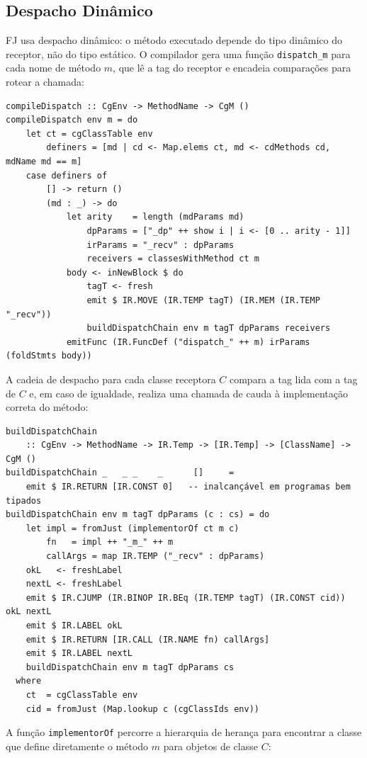 \subsection{Despacho Dinâmico}

FJ usa despacho dinâmico: o método executado depende do tipo dinâmico
do receptor, não do tipo estático. O compilador gera uma função
\texttt{dispatch\_m} para cada nome de método \(m\), que lê a tag do
receptor e encadeia comparações para rotear a chamada:

\begin{verbatim}
compileDispatch :: CgEnv -> MethodName -> CgM ()
compileDispatch env m = do
    let ct = cgClassTable env
        definers = [md | cd <- Map.elems ct, md <- cdMethods cd, mdName md == m]
    case definers of
        [] -> return ()
        (md : _) -> do
            let arity    = length (mdParams md)
                dpParams = ["_dp" ++ show i | i <- [0 .. arity - 1]]
                irParams = "_recv" : dpParams
                receivers = classesWithMethod ct m
            body <- inNewBlock $ do
                tagT <- fresh
                emit $ IR.MOVE (IR.TEMP tagT) (IR.MEM (IR.TEMP "_recv"))
                buildDispatchChain env m tagT dpParams receivers
            emitFunc (IR.FuncDef ("dispatch_" ++ m) irParams (foldStmts body))
\end{verbatim}

A cadeia de despacho para cada classe receptora \(C\) compara a tag lida
com a tag de \(C\) e, em caso de igualdade, realiza uma chamada de cauda
à implementação correta do método:

\begin{verbatim}
buildDispatchChain
    :: CgEnv -> MethodName -> IR.Temp -> [IR.Temp] -> [ClassName] -> CgM ()
buildDispatchChain _   _ _    _      []     =
    emit $ IR.RETURN [IR.CONST 0]   -- inalcançável em programas bem tipados
buildDispatchChain env m tagT dpParams (c : cs) = do
    let impl = fromJust (implementorOf ct m c)
        fn   = impl ++ "_m_" ++ m
        callArgs = map IR.TEMP ("_recv" : dpParams)
    okL   <- freshLabel
    nextL <- freshLabel
    emit $ IR.CJUMP (IR.BINOP IR.BEq (IR.TEMP tagT) (IR.CONST cid)) okL nextL
    emit $ IR.LABEL okL
    emit $ IR.RETURN [IR.CALL (IR.NAME fn) callArgs]
    emit $ IR.LABEL nextL
    buildDispatchChain env m tagT dpParams cs
  where
    ct  = cgClassTable env
    cid = fromJust (Map.lookup c (cgClassIds env))
\end{verbatim}

A função \texttt{implementorOf} percorre a hierarquia de herança para
encontrar a classe que define diretamente o método \(m\) para
objetos de classe \(C\):

